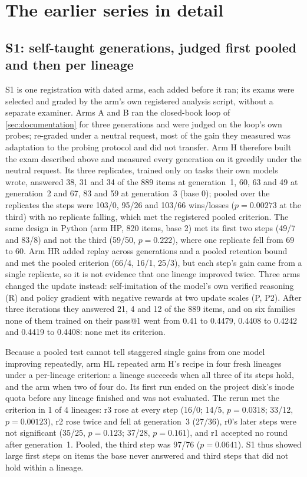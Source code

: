 
\section{The earlier series in detail}\label{app:series}

\subsection{S1: self-taught generations, judged first pooled and then per lineage}\label{sec:rsi1}

S1 is one registration with dated arms, each added before it ran; its exams were selected and
graded by the arm's own registered analysis script, without a separate examiner. Arms A and B
ran the closed-book loop of \cref{sec:documentation} for three generations and were judged on the
loop's own probes; re-graded under a neutral request, most of the gain they measured was adaptation
to the probing protocol and did not transfer. Arm H therefore built the exam described
above and measured every generation on it greedily under the neutral request. Its three replicates,
trained only on tasks their own models wrote, answered 38, 31 and 34 of the 889 items at
generation~1, 60, 63 and 49 at generation~2 and 67, 83 and 59 at generation~3 (base 0); pooled over the
replicates the steps were 103/0, 95/26 and 103/66 wins/losses ($p=0.00273$ at the third) with no
replicate falling, which met the registered pooled criterion. The same design in Python
(arm HP, 820 items, base 2) met its first two steps (49/7 and 83/8) and not the third (59/50,
$p=0.222$), where one replicate fell from 69 to 60. Arm HR added replay across generations
and a pooled retention bound and met the pooled criterion (66/4, 16/1, 25/3), but each step's gain came
from a single replicate, so it is not evidence that one lineage improved twice. Three arms
changed the update instead: self-imitation of the model's own verified reasoning (R) and policy
gradient with negative rewards at two update scales (P, P2). After three iterations they answered 21,
4 and 12 of the 889 items, and on six families none of them trained on their pass@1 went from 0.41
to 0.4479, 0.4408 to 0.4242 and 0.4419 to 0.4408: none met its criterion.

Because a pooled test cannot tell staggered single gains from one model improving repeatedly, arm HL
repeated arm H's recipe in four fresh lineages under a per-lineage criterion: a lineage succeeds when
all three of its steps hold, and the arm when two of four do. Its first run ended on the project disk's
inode quota before any lineage finished and was not evaluated. The rerun met the criterion in
1 of 4 lineages: r3 rose at every step (16/0; 14/5, $p=0.0318$; 33/12, $p=0.00123$), r2 rose twice and
fell at generation~3 (27/36), r0's later steps were not significant (35/25, $p=0.123$; 37/28,
$p=0.161$), and r1 accepted no round after generation~1. Pooled, the third step was 97/76
($p=0.0641$). S1 thus showed large first steps on items the base never answered and
third steps that did not hold within a lineage.

